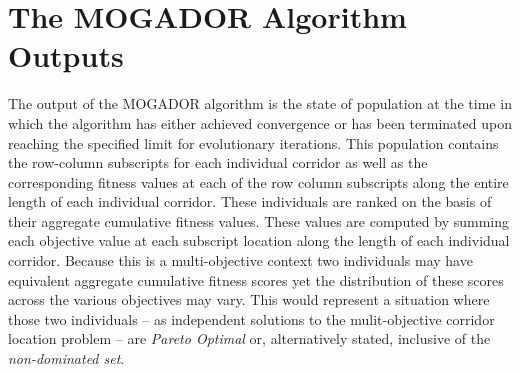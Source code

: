 \section{The MOGADOR Algorithm Outputs}

The output of the MOGADOR algorithm is the state of population at the time in which the algorithm has either achieved convergence or has been terminated upon reaching the specified limit for evolutionary iterations. This population contains the row-column subscripts for each individual corridor as well as the corresponding fitness values at each of the row column subscripts along the entire length of each individual corridor. These individuals are ranked on the basis of their aggregate cumulative fitness values. These values are computed by summing each objective value at each subscript location along the length of each individual corridor. Because this is a multi-objective context two individuals may have equivalent aggregate cumulative fitness scores yet the distribution of these scores across the various objectives may vary. This would represent a situation where those two individuals -- as independent solutions to the mulit-objective corridor location problem -- are \textit{Pareto Optimal} or, alternatively stated, inclusive of the \textit{non-dominated set}.

\clearpage
